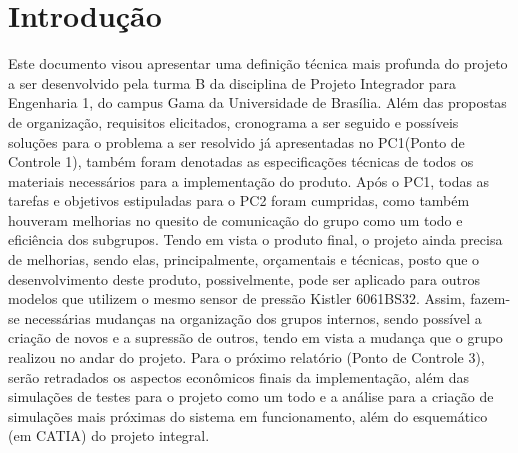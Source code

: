 \chapter{Introdução}
Este documento visou apresentar uma definição técnica mais profunda do projeto a ser desenvolvido pela turma B da disciplina de Projeto Integrador para Engenharia 1, do campus Gama da Universidade de Brasília. Além das propostas de organização, requisitos elicitados, cronograma a ser seguido e possíveis soluções para o problema a ser resolvido já apresentadas no PC1(Ponto de Controle 1), também foram denotadas as especificações técnicas de todos os materiais necessários para a implementação do produto. Após o PC1, todas as tarefas e objetivos estipuladas para o PC2 foram cumpridas, como também houveram melhorias no quesito de comunicação do grupo como um todo e eficiência dos subgrupos. Tendo em vista o produto final, o projeto ainda precisa de melhorias, sendo elas, principalmente, orçamentais e técnicas, posto que o desenvolvimento deste produto, possivelmente, pode ser aplicado para outros modelos que utilizem o mesmo sensor de pressão Kistler 6061BS32. Assim, fazem-se necessárias mudanças na organização dos grupos internos, sendo possível a criação de novos e a supressão de outros, tendo em vista a mudança que o grupo realizou no andar do projeto. Para o próximo relatório (Ponto de Controle 3), serão retradados os aspectos econômicos finais da implementação, além das simulações de testes para o projeto como um todo e a análise para a criação de simulações mais próximas do sistema em funcionamento, além do esquemático (em CATIA) do projeto integral. 

